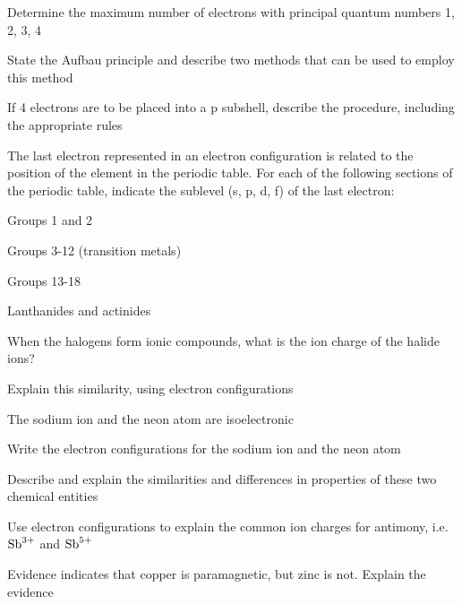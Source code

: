 \begin{problems}
    \item Determine the maximum number of electrons with principal quantum numbers 1, 2, 3, 4
    \item State the Aufbau principle and describe two methods that can be used to employ this
        method
    \item If 4 electrons are to be placed into a p subshell, describe the procedure, including
        the appropriate rules
    \item The last electron represented in an electron configuration is related to the position
        of the element in the periodic table. For each of the following sections of the periodic
        table, indicate the sublevel (s, p, d, f) of the last electron:
        \begin{enum-alph}
            \item Groups 1 and 2
            \item Groups 3-12 (transition metals)
            \item Groups 13-18
            \item Lanthanides and actinides
        \end{enum-alph}
    \item
        \begin{enum-alph}
            \item When the halogens form ionic compounds, what is the ion charge of the halide
                ions?
            \item Explain this similarity, using electron configurations
        \end{enum-alph}
    \item The sodium ion and the neon atom are isoelectronic
        \begin{enum-alph}
            \item Write the electron configurations for the sodium ion and the neon atom
            \item Describe and explain the similarities and differences in properties of these
                two chemical entities
        \end{enum-alph}
    \item Use electron configurations to explain the common ion charges for antimony, i.e. 
        $\ch{Sb^{3+}}$ and $\ch{Sb^{5+}}$
    \item Evidence indicates that copper is paramagnetic, but zinc is not. Explain the evidence
\end{problems}
